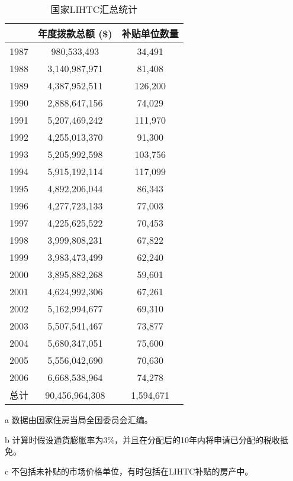 \documentclass[lang=cn,11pt,a4paper]{paper}
\begin{document}
\begin{table}[h]
\centering
\setlength{\tabcolsep}{12mm}
  \begin{threeparttable}
  \caption{国家LIHTC汇总统计}\label{tab1}
    \begin{tabular}{ccc}
  \toprule
  & 年度拨款总额 (\$)\tnote{b}
  & 补贴单位数量\tnote{c} \\
  \midrule
  1987 & 980,533,493 & 34,491 \\
  1988 & 3,140,987,971 & 81,408 \\
  1989 & 4,387,952,511 & 126,200 \\
  1990 & 2,888,647,156 & 74,029 \\
  1991 & 5,207,469,242 & 111,970 \\
  1992 & 4,255,013,370 & 91,300 \\
  1993 & 5,205,992,598 & 103,756 \\
  1994 & 5,915,192,114 & 117,099 \\
  1995 & 4,892,206,044 & 86,343 \\
  1996 & 4,277,723,133 & 77,003 \\
  1997 & 4,225,625,522 & 70,453 \\
  1998 & 3,999,808,231 & 67,822 \\
  1999 & 3,983,473,499 & 62,240 \\
  2000 & 3,895,882,268 & 59,601 \\
  2001 & 4,624,992,306 & 67,261 \\
  2002 & 5,162,994,677 & 69,310 \\
  2003 & 5,507,541,467 & 73,877 \\
  2004 & 5,680,347,051 & 75,600 \\
  2005 & 5,556,042,690 & 70,630 \\
  2006 & 6,668,538,964 & 74,278 \\
  总计 & 90,456,964,308 & 1,594,671 \\
  \bottomrule
    \end{tabular}
  \begin{tablenotes}
    \footnotesize
    \item[a] 数据由国家住房当局全国委员会汇编。
    \item[b] 计算时假设通货膨胀率为3\%，并且在分配后的10年内将申请已分配的税收抵免。
    \item[c] 不包括未补贴的市场价格单位，有时包括在LIHTC补贴的房产中。
  \end{tablenotes}
\end{threeparttable}
\end{table}
\end{document}
